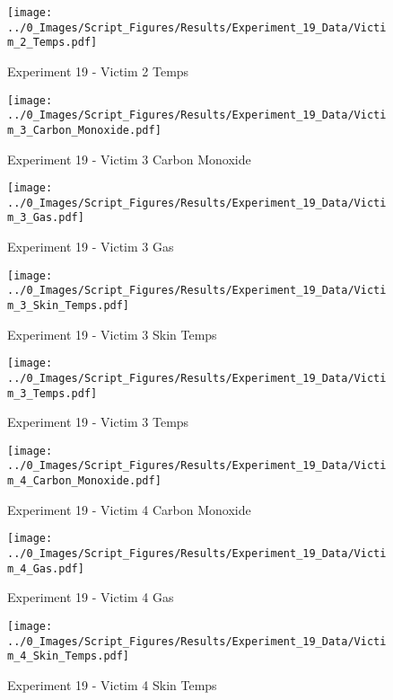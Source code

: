 	\begin{figure}[H]
		\centering
		\texttt{[image: ../0\_Images/Script\_Figures/Results/Experiment\_19\_Data/Victim\_2\_Temps.pdf]}
		\caption[]{Experiment 19 - Victim 2 Temps}
	\end{figure}
 
	\clearpage

	\begin{figure}[H]
		\centering
		\texttt{[image: ../0\_Images/Script\_Figures/Results/Experiment\_19\_Data/Victim\_3\_Carbon\_Monoxide.pdf]}
		\caption[]{Experiment 19 - Victim 3 Carbon Monoxide}
	\end{figure}
 

	\begin{figure}[H]
		\centering
		\texttt{[image: ../0\_Images/Script\_Figures/Results/Experiment\_19\_Data/Victim\_3\_Gas.pdf]}
		\caption[]{Experiment 19 - Victim 3 Gas}
	\end{figure}
 
	\clearpage

	\begin{figure}[H]
		\centering
		\texttt{[image: ../0\_Images/Script\_Figures/Results/Experiment\_19\_Data/Victim\_3\_Skin\_Temps.pdf]}
		\caption[]{Experiment 19 - Victim 3 Skin Temps}
	\end{figure}
 

	\begin{figure}[H]
		\centering
		\texttt{[image: ../0\_Images/Script\_Figures/Results/Experiment\_19\_Data/Victim\_3\_Temps.pdf]}
		\caption[]{Experiment 19 - Victim 3 Temps}
	\end{figure}
 
	\clearpage

	\begin{figure}[H]
		\centering
		\texttt{[image: ../0\_Images/Script\_Figures/Results/Experiment\_19\_Data/Victim\_4\_Carbon\_Monoxide.pdf]}
		\caption[]{Experiment 19 - Victim 4 Carbon Monoxide}
	\end{figure}
 

	\begin{figure}[H]
		\centering
		\texttt{[image: ../0\_Images/Script\_Figures/Results/Experiment\_19\_Data/Victim\_4\_Gas.pdf]}
		\caption[]{Experiment 19 - Victim 4 Gas}
	\end{figure}
 
	\clearpage

	\begin{figure}[H]
		\centering
		\texttt{[image: ../0\_Images/Script\_Figures/Results/Experiment\_19\_Data/Victim\_4\_Skin\_Temps.pdf]}
		\caption[]{Experiment 19 - Victim 4 Skin Temps}
	\end{figure}
 

